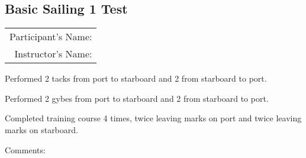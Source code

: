 \documentclass[12pt]{scrartcl}
\begin{document}
\newpage
\thispagestyle{empty}
\begin{Large}

	\section{Basic Sailing 1 Test} \label{sec:test}

	\begin{tabular}{r}
		Participant's Name:\\
		Instructor's Name:\\
	\end{tabular}

	\vspace{3cm}

	\begin{test}
	\item Performed 2 tacks from port to starboard and 2 from starboard to port.
	\item Performed 2 gybes from port to starboard and 2 from starboard to port.
	\item Completed training course 4 times, twice leaving marks on port and twice leaving marks on starboard.
	\end{test}

	\vspace{3cm}

	Comments:

\end{Large}
\end{document}
